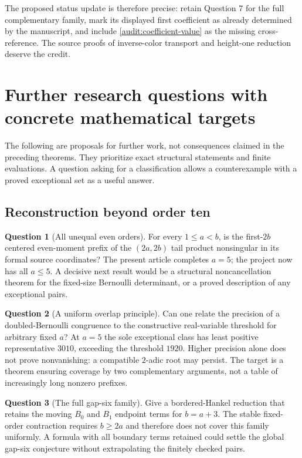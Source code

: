 \documentclass[11pt]{article}
\theoremstyle{definition}
\newtheorem{question}{Question}
\theoremstyle{remark}
\numberwithin{equation}{section}
\begin{document}
The proposed status update is therefore precise: retain Question 7 for
the full complementary family, mark its displayed first coefficient as
already determined by the manuscript, and include
\eqref{audit:coefficient-value} as the missing cross-reference. The source
proofs of inverse-color transport and height-one reduction deserve the
credit.


\section{Further research questions with concrete mathematical targets}
\label{future:sec}

The following are proposals for further work, not consequences claimed
in the preceding theorems. They prioritize exact structural statements
and finite evaluations. A question asking for a classification allows
a counterexample with a proved exceptional set as a useful answer.

\subsection{Reconstruction beyond order ten}

\begin{question}[All unequal even orders]
For every $1\le a<b$, is the first-$2b$ centered even-moment prefix
of the $(2a,2b)$ tail product nonsingular in its formal source
coordinates? The present article completes $a=5$; the project now
has all $a\le5$. A decisive next result would be a structural
noncancellation theorem for the fixed-size Bernoulli determinant,
or a proved description of any exceptional pairs.
\end{question}

\begin{question}[A uniform overlap principle]
Can one relate the precision of a doubled-Bernoulli congruence to the
constructive real-variable threshold for arbitrary fixed $a$?
At $a=5$ the sole exceptional class has least positive representative
$3010$, exceeding the threshold $1920$. Higher precision alone does
not prove nonvanishing: a compatible $2$-adic root may persist. The
target is a theorem ensuring coverage by two complementary arguments,
not a table of increasingly long nonzero prefixes.
\end{question}

\begin{question}[The full gap-six family]
Give a bordered-Hankel reduction that retains the moving $B_0$ and
$B_1$ endpoint terms for $b=a+3$. The stable fixed-order contraction
requires $b\ge2a$ and therefore does not cover this family uniformly.
A formula with all boundary terms retained could settle the global
gap-six conjecture without extrapolating the finitely checked pairs.
\end{question}
\end{document}
